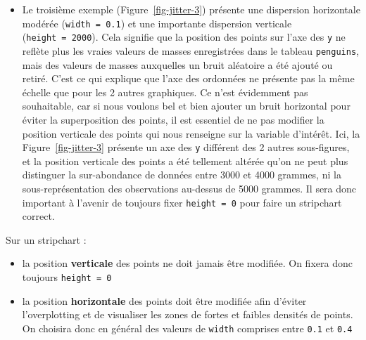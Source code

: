 \documentclass[
  a4paper,
  DIV=11,
  numbers=noendperiod,
  oneside]{scrreprt}
\providecommand{\tightlist}{%
  \setlength{\itemsep}{0pt}\setlength{\parskip}{0pt}}\usepackage{longtable,booktabs,array}
\begin{document}
\begin{itemize}
\item
  Le troisième exemple (Figure~\ref{fig-jitter-3}) présente une
  dispersion horizontale modérée (\texttt{width\ =\ 0.1}) et une
  importante dispersion verticale (\texttt{height\ =\ 2000}). Cela
  signifie que la position des points sur l'axe des \texttt{y} ne
  reflète plus les vraies valeurs de masses enregistrées dans le tableau
  \texttt{penguins}, mais des valeurs de masses auxquelles un bruit
  aléatoire a été ajouté ou retiré. C'est ce qui explique que l'axe des
  ordonnées ne présente pas la même échelle que pour les 2 autres
  graphiques. Ce n'est évidemment pas souhaitable, car si nous voulons
  bel et bien ajouter un bruit horizontal pour éviter la superposition
  des points, il est essentiel de ne pas modifier la position verticale
  des points qui nous renseigne sur la variable d'intérêt. Ici, la
  Figure~\ref{fig-jitter-3} présente un axe des \texttt{y} différent des
  2 autres sous-figures, et la position verticale des points a été
  tellement altérée qu'on ne peut plus distinguer la sur-abondance de
  données entre 3000 et 4000 grammes, ni la sous-représentation des
  observations au-dessus de 5000 grammes. Il sera donc important à
  l'avenir de toujours fixer \texttt{height\ =\ 0} pour faire un
  stripchart correct.
\end{itemize}

\begin{tcolorbox}[enhanced jigsaw, colbacktitle=quarto-callout-important-color!10!white, left=2mm, leftrule=.75mm, titlerule=0mm, bottomtitle=1mm, colback=white, breakable, arc=.35mm, bottomrule=.15mm, toprule=.15mm, toptitle=1mm, opacitybacktitle=0.6, title=\textcolor{quarto-callout-important-color}{\faExclamation}\hspace{0.5em}{Important}, coltitle=black, rightrule=.15mm, opacityback=0, colframe=quarto-callout-important-color-frame]

Sur un stripchart :

\begin{itemize}
\tightlist
\item
  la position \textbf{verticale} des points ne doit jamais être
  modifiée. On fixera donc toujours \texttt{height\ =\ 0}
\item
  la position \textbf{horizontale} des points doit être modifiée afin
  d'éviter l'overplotting et de visualiser les zones de fortes et
  faibles densités de points. On choisira donc en général des valeurs de
  \texttt{width} comprises entre \texttt{0.1} et \texttt{0.4}
\end{itemize}

\end{tcolorbox}
\end{document}
